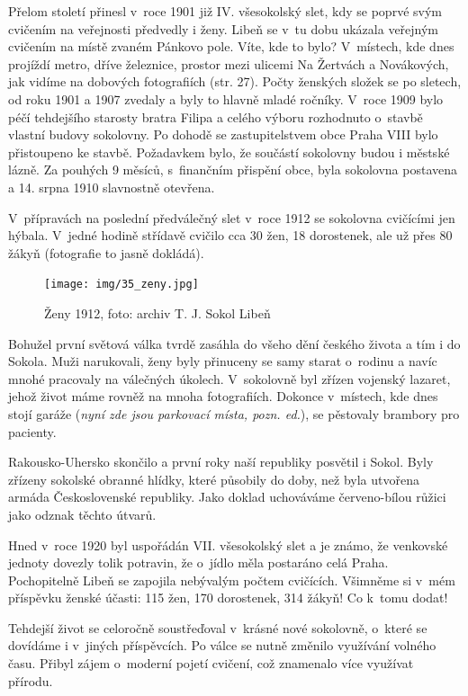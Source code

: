 \documentclass[a5paper, 11pt, twoside]{article}
\begin{document}
Přelom století přinesl v~roce 1901 již IV. všesokolský slet, kdy se
poprvé svým cvičením na veřejnosti předvedly i ženy. Libeň se v~tu dobu
ukázala veřejným cvičením na místě zvaném Pánkovo pole. Víte, kde to
bylo? V~místech, kde dnes projíždí metro, dříve železnice, prostor mezi
ulicemi Na Žertvách a Novákových, jak vidíme na dobových fotografiích (str. 27). %
Počty ženských složek se po sletech, od roku 1901 a 1907 zvedaly a byly
to hlavně mladé ročníky. V~roce 1909 bylo péčí tehdejšího starosty
bratra Filipa a celého výboru rozhodnuto o~stavbě vlastní budovy
sokolovny. Po dohodě se zastupitelstvem obce Praha VIII bylo přistoupeno
ke stavbě. Požadavkem bylo, že součástí sokolovny budou i městské lázně.
Za pouhých 9 měsíců, s~finančním přispění obce, byla sokolovna postavena
a 14. srpna 1910 slavnostně otevřena.

V~přípravách na poslední předválečný slet v~roce 1912 se sokolovna
cvičícími jen hýbala. V~jedné hodině střídavě cvičilo cca 30 žen, 18
dorostenek, ale už přes 80 žákyň (fotografie to jasně dokládá).

\begin{figure}[h!]
  \centering 
  \texttt{[image: img/35\_zeny.jpg]}
  \caption*{Ženy 1912, foto: archiv T. J. Sokol Libeň}
\end{figure}

Bohužel první světová válka tvrdě zasáhla do všeho dění českého života a
tím i do Sokola. Muži narukovali, ženy byly přinuceny se samy starat
o~rodinu a navíc mnohé pracovaly na válečných úkolech. V~sokolovně byl
zřízen vojenský lazaret, jehož život máme rovněž na mnoha fotografiích.
Dokonce v~místech, kde dnes stojí garáže (\textit{nyní zde jsou parkovací
místa, pozn. ed.}), se pěstovaly brambory pro pacienty.

Rakousko-Uhersko skončilo a první roky naší republiky posvětil i Sokol.
Byly zřízeny sokolské obranné hlídky, které působily do doby, než byla
utvořena armáda Československé republiky. Jako doklad uchováváme
červeno-bílou růžici jako odznak těchto útvarů.

Hned v~roce 1920 byl uspořádán VII. všesokolský slet a je známo, že
venkovské jednoty dovezly tolik potravin, že o~jídlo měla postaráno celá
Praha. Pochopitelně Libeň se zapojila nebývalým počtem cvičících.
Všimněme si v~mém příspěvku ženské účasti: 115 žen, 170 dorostenek, 314
žákyň! Co k~tomu dodat!

Tehdejší život se celoročně soustřeďoval v~krásné nové sokolovně,
o~které se dovídáme i v~jiných příspěvcích. Po válce se nutně změnilo
využívání volného času. Přibyl zájem o~moderní pojetí cvičení, což
znamenalo více využívat přírodu.
\end{document}
